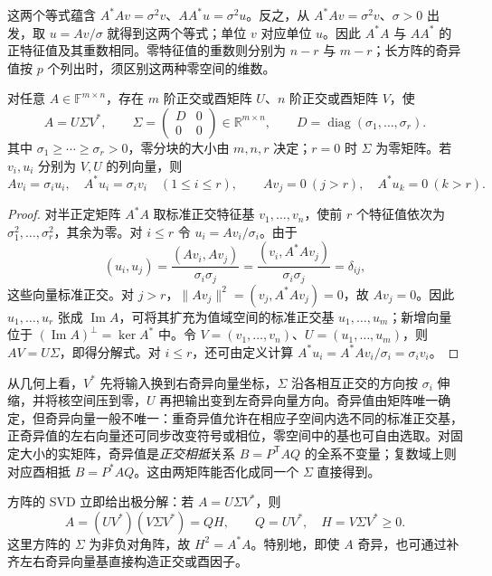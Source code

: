 这两个等式蕴含 $A^*Av=\sigma^2v$、$AA^*u=\sigma^2u$。反之，从 $A^*Av=\sigma^2v$、$\sigma>0$ 出发，取 $u=Av/\sigma$ 就得到这两个等式；单位 $v$ 对应单位 $u$。因此 $A^*A$ 与 $AA^*$ 的正特征值及其重数相同。零特征值的重数则分别为 $n-r$ 与 $m-r$；长方阵的奇异值按 $p$ 个列出时，须区别这两种零空间的维数。

\begin{theorem}[奇异值分解]
\label{thm:svd}
对任意 $A\in\mathbb F^{m\times n}$，存在 $m$ 阶正交或酉矩阵 $U$、$n$ 阶正交或酉矩阵 $V$，使
\begin{equation}
\label{eq:svd}
    A=U\Sigma V^*,\qquad
    \Sigma=\begin{pmatrix}D&0\\0&0\end{pmatrix}\in\mathbb R^{m\times n},
    \qquad D=\operatorname{diag}(\sigma_1,\ldots,\sigma_r).
\end{equation}
其中 $\sigma_1\geq\cdots\geq\sigma_r>0$，零分块的大小由 $m,n,r$ 决定；$r=0$ 时 $\Sigma$ 为零矩阵。若 $v_i,u_i$ 分别为 $V,U$ 的列向量，则
\[
    Av_i=\sigma_i u_i,\quad A^*u_i=\sigma_i v_i\quad(1\leq i\leq r),
    \qquad Av_j=0\ (j>r),\quad A^*u_k=0\ (k>r).
\]
\end{theorem}
\begin{proof}
对半正定矩阵 $A^*A$ 取标准正交特征基 $v_1,\ldots,v_n$，使前 $r$ 个特征值依次为 $\sigma_1^2,\ldots,\sigma_r^2$，其余为零。对 $i\leq r$ 令 $u_i=Av_i/\sigma_i$。由于
\[
    (u_i,u_j)=\frac{(Av_i,Av_j)}{\sigma_i\sigma_j}
    =\frac{(v_i,A^*Av_j)}{\sigma_i\sigma_j}=\delta_{ij},
\]
这些向量标准正交。对 $j>r$，$\|Av_j\|^2=(v_j,A^*Av_j)=0$，故 $Av_j=0$。因此 $u_1,\ldots,u_r$ 张成 $\operatorname{Im}A$，可将其扩充为值域空间的标准正交基 $u_1,\ldots,u_m$；新增向量位于 $(\operatorname{Im}A)^\perp=\ker A^*$ 中。令 $V=(v_1,\ldots,v_n)$、$U=(u_1,\ldots,u_m)$，则 $AV=U\Sigma$，即得分解式。对 $i\leq r$，还可由定义计算 $A^*u_i=A^*Av_i/\sigma_i=\sigma_iv_i$。
\end{proof}

从几何上看，$V^*$ 先将输入换到右奇异向量坐标，$\Sigma$ 沿各相互正交的方向按 $\sigma_i$ 伸缩，并将核空间压到零，$U$ 再把输出变到左奇异向量方向。奇异值由矩阵唯一确定，但奇异向量一般不唯一：重奇异值允许在相应子空间内选不同的标准正交基，正奇异值的左右向量还可同步改变符号或相位，零空间中的基也可自由选取。对固定大小的实矩阵，奇异值是\emph{正交相抵}关系 $B=P^{\mathsf T}AQ$ 的全系不变量；复数域上则对应酉相抵 $B=P^*AQ$。这由两矩阵能否化成同一个 $\Sigma$ 直接得到。

方阵的 SVD 立即给出极分解：若 $A=U\Sigma V^*$，则
\begin{equation}
\label{eq:svd-to-polar}
    A=(UV^*)(V\Sigma V^*)=QH,
    \qquad Q=UV^*,\quad H=V\Sigma V^*\geq0.
\end{equation}
这里方阵的 $\Sigma$ 为非负对角阵，故 $H^2=A^*A$。特别地，即使 $A$ 奇异，也可通过补齐左右奇异向量基直接构造正交或酉因子。


